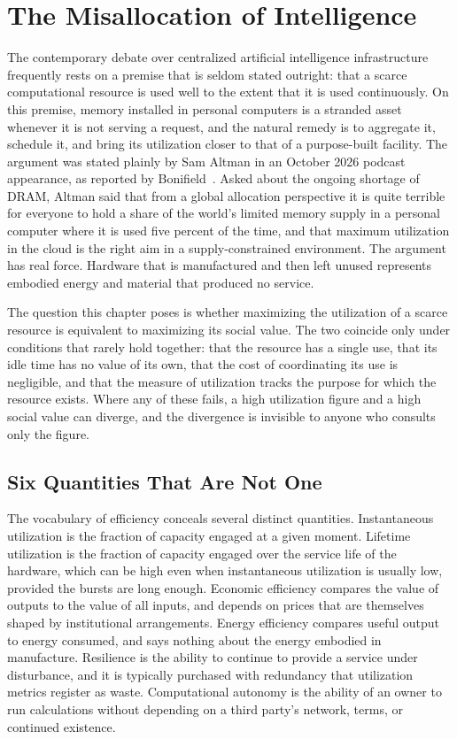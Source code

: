 \chapter{The Misallocation of Intelligence}
\label{ch:misallocation}

The contemporary debate over centralized artificial intelligence infrastructure frequently rests on a premise that is seldom stated outright: that a scarce computational resource is used well to the extent that it is used continuously. On this premise, memory installed in personal computers is a stranded asset whenever it is not serving a request, and the natural remedy is to aggregate it, schedule it, and bring its utilization closer to that of a purpose-built facility. The argument was stated plainly by Sam Altman in an October 2026 podcast appearance, as reported by Bonifield~\cite{bonifield2026}. Asked about the ongoing shortage of DRAM, Altman said that from a global allocation perspective it is quite terrible for everyone to hold a share of the world's limited memory supply in a personal computer where it is used five percent of the time, and that maximum utilization in the cloud is the right aim in a supply-constrained environment. The argument has real force. Hardware that is manufactured and then left unused represents embodied energy and material that produced no service.

The question this chapter poses is whether maximizing the utilization of a scarce resource is equivalent to maximizing its social value. The two coincide only under conditions that rarely hold together: that the resource has a single use, that its idle time has no value of its own, that the cost of coordinating its use is negligible, and that the measure of utilization tracks the purpose for which the resource exists. Where any of these fails, a high utilization figure and a high social value can diverge, and the divergence is invisible to anyone who consults only the figure.

\section{Six Quantities That Are Not One}

The vocabulary of efficiency conceals several distinct quantities. Instantaneous utilization is the fraction of capacity engaged at a given moment. Lifetime utilization is the fraction of capacity engaged over the service life of the hardware, which can be high even when instantaneous utilization is usually low, provided the bursts are long enough. Economic efficiency compares the value of outputs to the value of all inputs, and depends on prices that are themselves shaped by institutional arrangements. Energy efficiency compares useful output to energy consumed, and says nothing about the energy embodied in manufacture. Resilience is the ability to continue to provide a service under disturbance, and it is typically purchased with redundancy that utilization metrics register as waste. Computational autonomy is the ability of an owner to run calculations without depending on a third party's network, terms, or continued existence.

